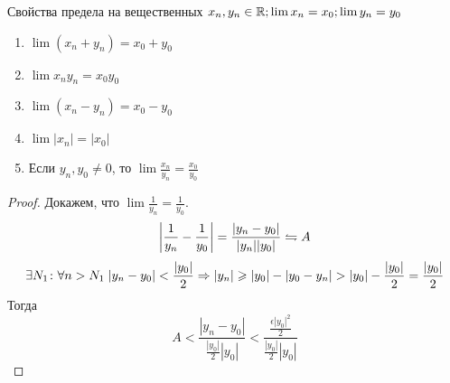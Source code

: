 \begin{theorem}{Свойства предела на вещественных}
$x_n, y_n \in \mathbb{R}; \lim x_n = x_0; \lim y_n = y_0$
\begin{enumerate}
\item $\lim (x_n + y_n) = x_0 + y_0$
\item $\lim x_ny_n = x_0y_0$
\item $\lim (x_n - y_n) = x_0 - y_0$
\item $\lim |x_n| = |x_0|$
\item Если $y_n, y_0 \ne 0$, то $\lim \frac{x_n}{y_n} = \frac{x_0}{y_0}$
\end{enumerate}
\end{theorem}
\begin{proof}
Докажем, что $\lim \frac1{y_n} = \frac1{y_0}$.
$$\left|\frac{1}{y_n} - \frac{1}{y_0}\right| = \frac{|y_n - y_0|}{|y_n||y_0|} \leftrightharpoons A$$
$$\exists N_1\colon \forall n > N_1\; |y_n-y_0| < \frac{|y_0|}2 \Rightarrow |y_n| \geqslant |y_0| - |y_0 - y_n| > |y_0| - \frac{|y_0|}2 = \frac{|y_0|}2$$
Тогда
$$A < \frac{|y_n - y_0|}{\frac{|y_0|}2 |y_0|} < \frac{\frac{\epsilon|y_0|^2}2}{\frac{|y_0|}2 |y_0|}$$
\end{proof}
